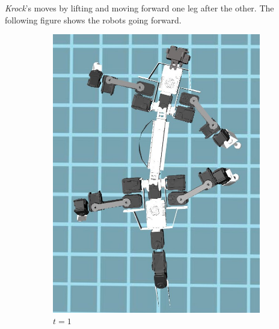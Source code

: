 \documentclass[../document.tex]{subfiles}
\begin{document}
\emph{Krock}'s moves by lifting and moving forward one leg after the other. The following figure shows the robots going forward.
	\begin{figure}[htbp]
\centering
    	\begin{subfigure}[b]{0.3\textwidth}
			\includegraphics[width=\textwidth]{../img/krock-moving-1}
			\caption{$t=1$}
	    \end{subfigure}
		\begin{subfigure}[b]{0.3\textwidth}

\end{subfigure}
\end{figure}
\end{document}

